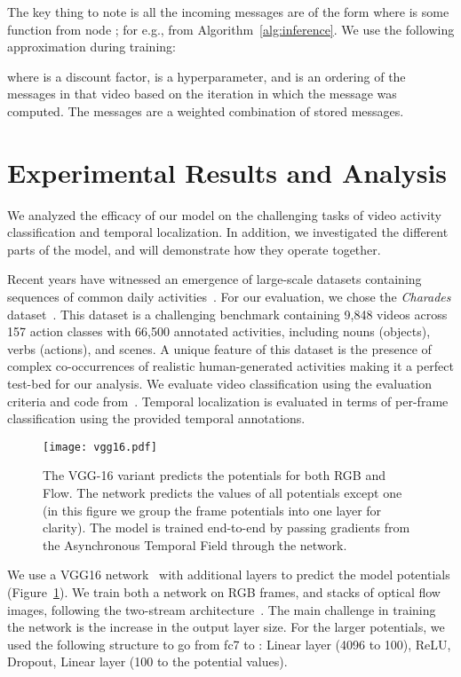 \documentclass[10pt,twocolumn,letterpaper]{article}
\newcommand{\myparagraph}[1]{\vspace{.3em}\noindent{\bf #1}}
\begin{document}
\myparagraph{Message Passing}
The key thing to note is all the incoming messages are of the form  where  is some function from node ; for e.g.,  from Algorithm~\ref{alg:inference}. We use the following approximation during training:

where  is a discount factor,  is a hyperparameter, and  is an ordering of the messages in that video based on the iteration in which the message was computed. The messages are a weighted combination of stored messages.

\section{Experimental Results and Analysis} 

We analyzed the efficacy of our model on the challenging tasks of video activity classification and temporal localization. In addition, we investigated the different parts of the model, and will demonstrate how they operate together.


\myparagraph{Dataset}
Recent years have witnessed an emergence of large-scale datasets containing sequences of common daily activities~\cite{charades,yeung2015every,weinzaepfel2016towards}. For our evaluation, we chose the {\em Charades} dataset~\cite{charades}. This dataset is a challenging benchmark containing 9,848 videos across 157 action classes with 66,500 annotated activities, including nouns (objects), verbs (actions), and scenes. A unique feature of this dataset is the presence of complex co-occurrences of realistic human-generated activities making it a perfect test-bed for our analysis. We evaluate video classification using the evaluation criteria and code from~\cite{charades}. Temporal localization is evaluated in terms of per-frame classification using the provided temporal annotations. 


\begin{figure}
\centering
\texttt{[image: vgg16.pdf]}
\caption{The VGG-16 variant predicts the potentials for both RGB and Flow. The network predicts the values of all potentials except one (in this figure we group the frame potentials  into one layer for clarity). The model is trained end-to-end by passing gradients from the Asynchronous Temporal Field through the network.}
\label{fig:CNN}
\end{figure}


\myparagraph{Implementation details}
We use a VGG16 network~\cite{Simonyan15} with additional layers to predict the model potentials (Figure~\ref{fig:CNN}). We train both a network on RGB frames, and stacks of optical flow images, following the two-stream architecture~\cite{2stream14}. The main challenge in training the network is the increase in the output layer size. For the larger potentials, we used the following structure to go from fc7 to : Linear layer (4096 to 100), ReLU, Dropout, Linear layer (100 to the potential values). 
\end{document}
